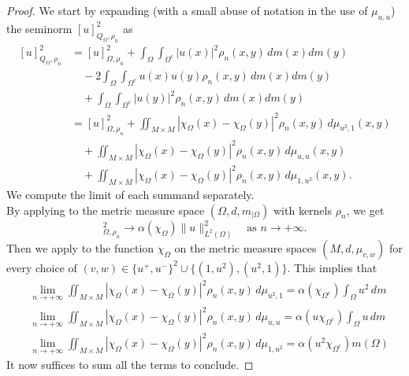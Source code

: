 \documentclass[reqno,11pt]{amsart}
\numberwithin{equation}{section}
\theoremstyle{definition} %
\theoremstyle{plain}
\theoremstyle{definition}
\theoremstyle{remark}
\def\elleom#1{L^{#1}(\Omega)}
\def\io{\int_\Omega}
\def\norma#1#2{ \|#1 \|_{#2}}
\def\semin#1#2{ [#1 ]_{#2}}
\newcommand{\abs}[1]{\left|#1\right|}
\begin{document}
\begin{proof}
    We start by expanding (with a small abuse of notation in the use of $\mu_{u,u}$) the seminorm $\semin{u}{Q_\Omega,\rho_n}^2$ as
    \begin{equation}
    \begin{split}
        \semin{u}{Q_\Omega,\rho_n}^2&
        =
        \semin{u}{\Omega,\rho_n}^2
        +\io\int_{{\Omega^c}} \abs{u(x)}^2\rho_n(x,y)\,dm(x)dm(y)\\
        &\quad-2\io\int_{{\Omega^c}} u(x)u(y)\rho_n(x,y)\,dm(x)dm(y)
        \\&\quad+\io\int_{{\Omega^c}} \abs{u(y)}^2\rho_n(x,y)\,dm(x)dm(y)
        \\&=
        \semin{u}{\Omega,\rho_n}^2
        +\iint_{M\times M}\abs{\chi_\Omega(x)-\chi_\Omega(y)}^2\rho_n(x,y)\,d\mu_{u^2,1}(x,y)\\&\quad
        +\iint_{M\times M}\abs{\chi_\Omega(x)-\chi_\Omega(y)}^2\rho_n(x,y)\,d\mu_{u,u}(x,y)\\&\quad
        +\iint_{M\times M}\abs{\chi_\Omega(x)-\chi_\Omega(y)}^2\rho_n(x,y)\,d\mu_{1,u^2}(x,y).
    \end{split}
    \end{equation}
    We compute the limit of each summand separately.\\
    By applying \cite[Theorem 2.16]{HanPinamontiXu2025} to the metric measure space $(\Omega,d,m_{|\Omega})$ with kernels $\rho_n$, we get 
    \begin{equation}
        \semin{u}{\Omega,\rho_n}^2\to \alpha(\chi_\Omega)\norma{u}{\elleom2}^2\quad\text{as } n\to+\infty.
    \end{equation}
    Then we apply \cite[Theorem 2.16]{HanPinamontiXu2025} to the function $\chi_\Omega$ on the metric measure spaces $(M,d,\mu_{v,w})$ for every choice of $(v,w)\in \{u^+,u^-\}^2\cup \{(1,u^2), (u^2,1)\}$. This implies that
    \begin{align}
        &
        \lim_{n\to+\infty}\iint_{M\times M}\abs{\chi_\Omega(x)-\chi_\Omega(y)}^2\rho_n(x,y)\,d\mu_{u^2,1}=\alpha(\chi_{\Omega^c})\io u^2\,dm\\
        &
        \lim_{n\to+\infty}\iint_{M\times M}\abs{\chi_\Omega(x)-\chi_\Omega(y)}^2\rho_n(x,y)\,d\mu_{u,u}=\alpha(u\chi_{\Omega^c})\io u\,dm\\
        &
        \lim_{n\to+\infty}\iint_{M\times M}\abs{\chi_\Omega(x)-\chi_\Omega(y)}^2\rho_n(x,y)\,d\mu_{1,u^2}=\alpha(u^2\chi_{\Omega^c})m(\Omega)
    \end{align}
    It now suffices to sum all the terms to conclude.
\end{proof}
\end{document}
